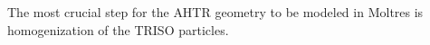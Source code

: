 The most crucial step for the \gls{AHTR} geometry to be modeled in Moltres is 
homogenization of the \gls{TRISO} particles. 




